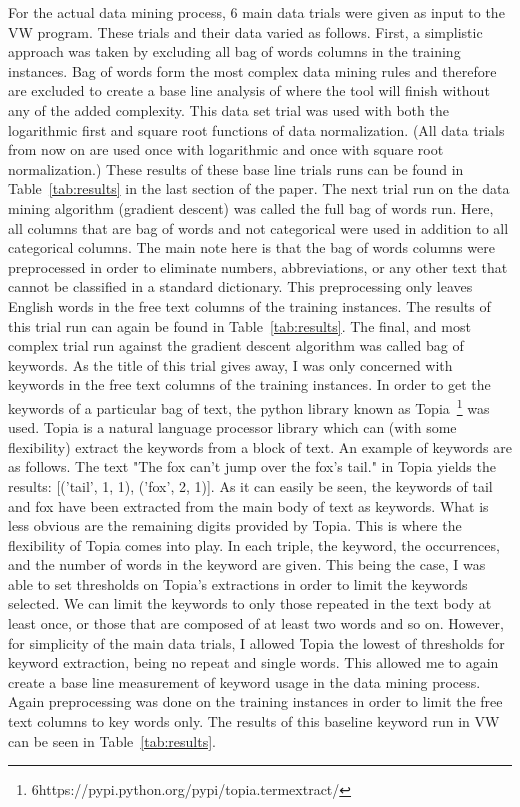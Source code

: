 \documentclass[conference]{IEEEtran}
\begin{document}
For the actual data mining process, 6 main data trials were given as input to
the VW program. These trials and their data varied as follows. First, a simplistic 
approach was taken by excluding all bag of words columns in the training
instances. Bag of words form the most complex data mining rules and therefore
are excluded to create a base line analysis of where the tool will finish without
any of the added complexity. This data set trial was used with both the logarithmic 
first and square root functions of data normalization. (All data trials
from now on are used once with logarithmic and once with square root normalization.) 
These results of these base line trials runs can be found in Table~\ref{tab:results}
in the last section of the paper. The next trial run on the data mining
algorithm (gradient descent) was called the full bag of words run. Here,
all columns that are bag of words and not categorical were used in addition to
all categorical columns. The main note here is that the bag of words columns
were preprocessed in order to eliminate numbers, abbreviations, or any other
text that cannot be classified in a standard dictionary. This preprocessing only
leaves English words in the free text columns of the training instances. The
results of this trial run can again be found in Table~\ref{tab:results}. The final, and most
complex trial run against the gradient descent algorithm was called
bag of keywords. As the title of this trial gives away, I was only concerned
with keywords in the free text columns of the training instances. In order to get
the keywords of a particular bag of text, the python library known as 
Topia~\footnote{6https://pypi.python.org/pypi/topia.termextract/}
was used. Topia is a natural language processor library which can (with some
flexibility) extract the keywords from a block of text. An example of keywords
are as follows. The text "The fox can’t jump over the fox’s tail." in Topia yields
the results: [(’tail’, 1, 1), (’fox’, 2, 1)]. As it can easily be seen, the keywords
of tail and fox have been extracted from the main body of text as keywords.
What is less obvious are the remaining digits provided by Topia. This is
where the flexibility of Topia comes into play. In each triple, the keyword, the
occurrences, and the number of words in the keyword are given. This being the
case, I was able to set thresholds on Topia’s extractions in order to limit the
keywords selected. We can limit the keywords to only those repeated in the
text body at least once, or those that are composed of at least two words and
so on. However, for simplicity of the main data trials, I allowed Topia the
lowest of thresholds for keyword extraction, being no repeat and single words.
This allowed me to again create a base line measurement of keyword usage in the
data mining process. Again preprocessing was done on the training instances
in order to limit the free text columns to key words only. The results of this
baseline keyword run in VW can be seen in Table~\ref{tab:results}.
\end{document}
